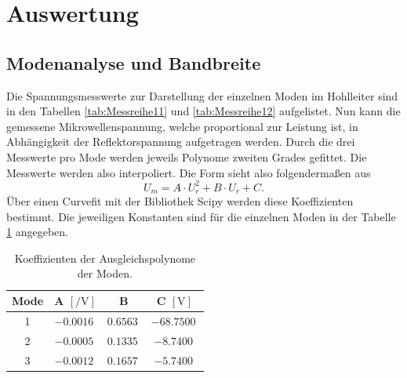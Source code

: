 \section{Auswertung}

\subsection{Modenanalyse und Bandbreite}

Die Spannungsmesswerte zur Darstellung der einzelnen Moden im Hohlleiter sind in den Tabellen \ref{tab:Messreihe11} und \ref{tab:Messreihe12} aufgelistet.
Nun kann die gemessene Mikrowellenspannung, welche proportional zur Leistung ist, in Abhängigkeit der Reflektorspannung aufgetragen werden. Durch die drei Messwerte pro Mode werden jeweils Polynome zweiten Grades gefittet. Die Messwerte werden also interpoliert.
Die Form sieht also folgendermaßen aus
\begin{equation*}
U_{m} = A \cdot U_{r}^2 + B \cdot  U_{r} + C.
\end{equation*}
Über einen Curvefit mit der Bibliothek Scipy \cite{scipy} werden diese Koeffizienten bestimmt.
Die jeweiligen Konstanten sind für die einzelnen Moden in der Tabelle \ref{tab:11} angegeben.

\begin{table}
    \centering
    \caption{Koeffizienten der Ausgleichspolynome der Moden.} 
    \label{tab:11}
    \begin{tabular}{c | c c c}
        \toprule
        Mode & A $[\si{\per\volt}] $ & B  & C $[\si{\volt}]$ \\
        \midrule
        1      &      $\SI{-0.0016}{}$         &       $\SI{0.6563}{}$             &        $\SI{-68.7500}{}$ \\
        2      &      $\SI{-0.0005}{}$         &       $\SI{0.1335}{}$             &        $\SI{-8.7400}{}$ \\
        3      &      $\SI{-0.0012}{}$         &       $\SI{0.1657}{}$             &        $\SI{-5.7400}{}$ \\
    \end{tabular}
\end{table}

